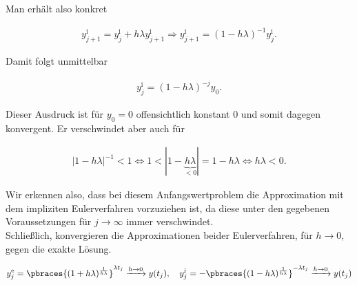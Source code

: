 \begin{solution}
Man erhält also konkret

\begin{align*}
  y_{j+1}^{\mathrm{i}}
  =
  y_j^{\mathrm{i}} + h \lambda y_{j+1}^{\mathrm{i}}
  \Rightarrow
  y_{j+1}^{\mathrm{i}}
  =
  (1 - h \lambda)^{-1} y_j^{\mathrm{i}}.
\end{align*}

Damit folgt unmittelbar

\begin{align*}
  y_j^{\mathrm{i}}
  =
  (1 - h \lambda)^{-j} y_0.
\end{align*}

Dieser Ausdruck ist für $y_0 = 0$ offensichtlich konstant $0$ und somit dagegen konvergent.
Er verschwindet aber auch für

\begin{align*}
  |1 - h \lambda|^{-1} < 1
  \Leftrightarrow
  1 < |1 - \underbrace{h \lambda}_{< 0}| = 1 - h \lambda
  \Leftrightarrow
  h \lambda < 0.
\end{align*}

Wir erkennen also, dass bei diesem Anfangswertproblem die Approximation mit dem impliziten Eulerverfahren vorzuziehen ist, da
diese unter den gegebenen Voraussetzungen für $j\to \infty$ immer verschwindet.
\\

Schließlich, konvergieren die Approximationen beider Eulerverfahren, für $h \to 0$, gegen die exakte Lösung.

\begin{align*}
  y_j^{\mathrm{e}}
  =
  \pbraces
  {
    (1 + h \lambda)^\frac{1}{h \lambda}
  }^{\lambda t_j}
  \xrightarrow{h \to 0}
  y(t_j),
  \quad
  y_j^{\mathrm{i}}
  =
  -\pbraces
  {
    (1 - h \lambda)^\frac{1}{h \lambda}
  }^{-\lambda t_j}
  \xrightarrow{h \to 0}
  y(t_j)
\end{align*}

\end{solution}
